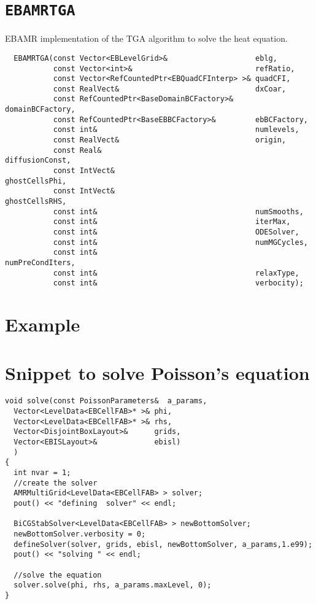 \section{{\tt EBAMRTGA} }
   EBAMR implementation of the TGA algorithm 
   to solve the heat equation.
\begin{small}\begin{verbatim}
  EBAMRTGA(const Vector<EBLevelGrid>&                    eblg,
           const Vector<int>&                            refRatio,
           const Vector<RefCountedPtr<EBQuadCFInterp> >& quadCFI,
           const RealVect&                               dxCoar,
           const RefCountedPtr<BaseDomainBCFactory>&     domainBCFactory,
           const RefCountedPtr<BaseEBBCFactory>&         ebBCFactory,
           const int&                                    numlevels,
           const RealVect&                               origin,
           const Real&                                   diffusionConst,
           const IntVect&                                ghostCellsPhi,
           const IntVect&                                ghostCellsRHS,
           const int&                                    numSmooths,
           const int&                                    iterMax,
           const int&                                    ODESolver,
           const int&                                    numMGCycles,
           const int&                                    numPreCondIters,
           const int&                                    relaxType,
           const int&                                    verbocity);
\end{verbatim}\end{small} 

\section{Example}
\section{Snippet to solve Poisson's equation}
\begin{small}\begin{verbatim}
void solve(const PoissonParameters&  a_params,
  Vector<LevelData<EBCellFAB>* >& phi,
  Vector<LevelData<EBCellFAB>* >& rhs,
  Vector<DisjointBoxLayout>&      grids,
  Vector<EBISLayout>&             ebisl)
  )
{
  int nvar = 1;
  //create the solver
  AMRMultiGrid<LevelData<EBCellFAB> > solver;
  pout() << "defining  solver" << endl;

  BiCGStabSolver<LevelData<EBCellFAB> > newBottomSolver;
  newBottomSolver.verbosity = 0;
  defineSolver(solver, grids, ebisl, newBottomSolver, a_params,1.e99);
  pout() << "solving " << endl;

  //solve the equation
  solver.solve(phi, rhs, a_params.maxLevel, 0);
}
 \end{verbatim} \end{small}

